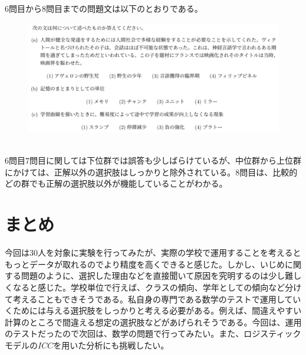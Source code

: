 \documentclass[12pt]{jarticle}
\begin{document}
$6$問目から$8$問目までの問題文は以下のとおりである。\\
\hrulefill
\vspace{6.5cm}
\begin{figure}[H]
  \includegraphics[bb = -7 60 1 1,scale = 0.4]{ques_5.png}
\end{figure}
\hrulefill\\
$6$問目$7$問目に関しては下位群では誤答も少しばらけているが、中位群から上位群にかけては、正解以外の選択肢はしっかりと除外されている。$8$問目は、比較的どの群でも正解の選択肢以外が機能していることがわかる。
\section{まとめ}
今回は$30$人を対象に実験を行ってみたが、実際の学校で運用することを考えるともっとデータが取れるのでより精度を高くできると感じた。しかし、いじめに関する問題のように、選択した理由などを直接聞いて原因を究明するのは少し難しくなると感じた。学校単位で行えば、クラスの傾向、学年としての傾向など分けて考えることもできそうである。私自身の専門である数学のテストで運用していくためには与える選択肢をしっかりと考える必要がある。例えば、間違えやすい計算のところで間違える想定の選択肢などがあげられそうである。今回は、運用のテストだったので次回は、数学の問題で行ってみたい。また、ロジスティックモデルの$ICC$を用いた分析にも挑戦したい。
\end{document}
